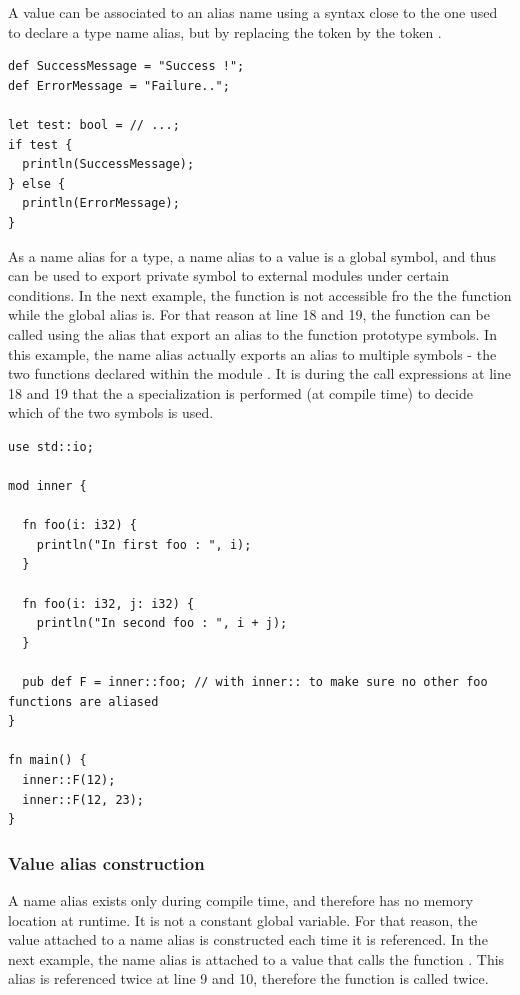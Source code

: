 A value can be associated to an alias name using a syntax close to the one used
to declare a type name alias, but by replacing the token \token{:} by the token
\token{=}.

\begin{lstlisting}[style=coloredverbatim]
def SuccessMessage = "Success !";
def ErrorMessage = "Failure..";

let test: bool = // ...;
if test {
  println(SuccessMessage);
} else {
  println(ErrorMessage);
}
\end{lstlisting}

As a name alias for a type, a name alias to a value is a global symbol, and thus
can be used to export private symbol to external modules under certain
conditions. In the next example, the function  is not accessible fro
the the  function while the global alias  is. For that
reason at line 18 and 19, the function  can be called using the alias
 that export an alias to the function prototype symbols. In this
example, the name alias actually exports an alias to multiple symbols - the two
functions  declared within the module . It is during the
call expressions at line 18 and 19 that the a specialization is performed (at
compile time) to decide which of the two symbols is used.

\begin{lstlisting}[style=coloredverbatim]
use std::io;

mod inner {

  fn foo(i: i32) {
    println("In first foo : ", i);
  }

  fn foo(i: i32, j: i32) {
    println("In second foo : ", i + j);
  }

  pub def F = inner::foo; // with inner:: to make sure no other foo functions are aliased
}

fn main() {
  inner::F(12);
  inner::F(12, 23);
}
\end{lstlisting}

\subsubsection*{Value alias construction}

A name alias exists only during compile time, and therefore has no memory
location at runtime. It is not a constant global variable. For that reason, the
value attached to a name alias is constructed each time it is referenced. In the
next example, the name alias  is attached to a value that calls the
function . This alias is referenced twice at line 9 and 10, therefore
the function  is called twice.

